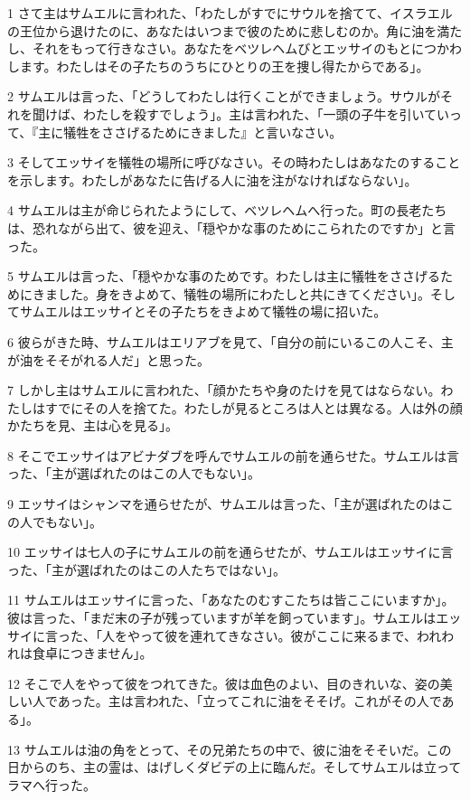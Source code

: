 \par 1 さて主はサムエルに言われた、「わたしがすでにサウルを捨てて、イスラエルの王位から退けたのに、あなたはいつまで彼のために悲しむのか。角に油を満たし、それをもって行きなさい。あなたをベツレヘムびとエッサイのもとにつかわします。わたしはその子たちのうちにひとりの王を捜し得たからである」。
\par 2 サムエルは言った、「どうしてわたしは行くことができましょう。サウルがそれを聞けば、わたしを殺すでしょう」。主は言われた、「一頭の子牛を引いていって、『主に犠牲をささげるためにきました』と言いなさい。
\par 3 そしてエッサイを犠牲の場所に呼びなさい。その時わたしはあなたのすることを示します。わたしがあなたに告げる人に油を注がなければならない」。
\par 4 サムエルは主が命じられたようにして、ベツレヘムへ行った。町の長老たちは、恐れながら出て、彼を迎え、「穏やかな事のためにこられたのですか」と言った。
\par 5 サムエルは言った、「穏やかな事のためです。わたしは主に犠牲をささげるためにきました。身をきよめて、犠牲の場所にわたしと共にきてください」。そしてサムエルはエッサイとその子たちをきよめて犠牲の場に招いた。
\par 6 彼らがきた時、サムエルはエリアブを見て、「自分の前にいるこの人こそ、主が油をそそがれる人だ」と思った。
\par 7 しかし主はサムエルに言われた、「顔かたちや身のたけを見てはならない。わたしはすでにその人を捨てた。わたしが見るところは人とは異なる。人は外の顔かたちを見、主は心を見る」。
\par 8 そこでエッサイはアビナダブを呼んでサムエルの前を通らせた。サムエルは言った、「主が選ばれたのはこの人でもない」。
\par 9 エッサイはシャンマを通らせたが、サムエルは言った、「主が選ばれたのはこの人でもない」。
\par 10 エッサイは七人の子にサムエルの前を通らせたが、サムエルはエッサイに言った、「主が選ばれたのはこの人たちではない」。
\par 11 サムエルはエッサイに言った、「あなたのむすこたちは皆ここにいますか」。彼は言った、「まだ末の子が残っていますが羊を飼っています」。サムエルはエッサイに言った、「人をやって彼を連れてきなさい。彼がここに来るまで、われわれは食卓につきません」。
\par 12 そこで人をやって彼をつれてきた。彼は血色のよい、目のきれいな、姿の美しい人であった。主は言われた、「立ってこれに油をそそげ。これがその人である」。
\par 13 サムエルは油の角をとって、その兄弟たちの中で、彼に油をそそいだ。この日からのち、主の霊は、はげしくダビデの上に臨んだ。そしてサムエルは立ってラマへ行った。
